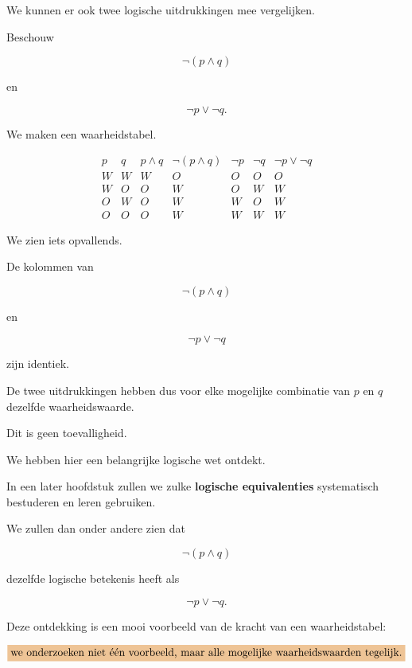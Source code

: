 \documentclass{ximera}
\begin{document}
  We kunnen er ook twee logische uitdrukkingen mee vergelijken.


  Beschouw

  \[
  \neg(p\land q)
  \]

  en

  \[
  \neg p\lor\neg q.
  \]

  We maken een waarheidstabel.

  \[
  \begin{array}{c|c|c|c|c|c|c}
  p&q&p\land q&\neg(p\land q)&\neg p&\neg q&
  \neg p\lor\neg q\\
  \hline
  W&W&W&O&O&O&O\\
  W&O&O&W&O&W&W\\
  O&W&O&W&W&O&W\\
  O&O&O&W&W&W&W
  \end{array}
  \]

  We zien iets opvallends.

  De kolommen van

  \[
  \neg(p\land q)
  \]

  en

  \[
  \neg p\lor\neg q
  \]

  zijn identiek.

  De twee uitdrukkingen hebben dus voor elke mogelijke combinatie van
  $p$ en $q$ dezelfde waarheidswaarde.


  \begin{opmerking}
  Dit is geen toevalligheid.

  We hebben hier een belangrijke logische wet ontdekt.

  In een later hoofdstuk zullen we zulke \textbf{logische equivalenties}
  systematisch bestuderen en leren gebruiken.

  We zullen dan onder andere zien dat

  \[
  \neg(p\land q)
  \]

  dezelfde logische betekenis heeft als

  \[
  \neg p\lor\neg q.
  \]
  \end{opmerking}


  Deze ontdekking is een mooi voorbeeld van de kracht van een
  waarheidstabel:

  \[
  \important{
  \text{we onderzoeken niet één voorbeeld, maar alle mogelijke
  waarheidswaarden tegelijk.}
  }
  \]


\end{document}
